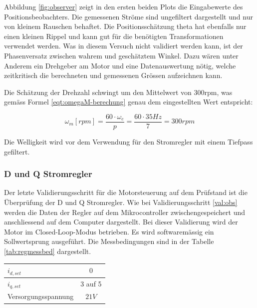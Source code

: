 Abbildung \ref{fig:observer} zeigt in den ersten beiden Plots die Eingabewerte des Positionsbeobachters. Die gemessenen Ströme sind ungefiltert dargestellt und nur von kleinem Rauschen behaftet. Die Positionsschätzung theta hat ebenfalls nur einen kleinen Rippel und kann gut für die benötigten Transformationen verwendet werden.
Was in diesem Versuch nicht validiert werden kann, ist der Phasenversatz zwischen wahrem und geschätztem Winkel. Dazu wären unter Anderem ein Drehgeber am Motor und eine Datenauswertung nötig, welche zeitkritisch die berechneten und gemessenen Grössen aufzeichnen kann.

Die Schätzung der Drehzahl schwingt um den Mittelwert von 300rpm, was gemäss Formel \ref{eqt:omegaM-berechung} genau dem eingestellten Wert entspricht:

\begin{equation}
	\omega_m [rpm] = \frac{60 \cdot \omega_e}{p} = \frac{60 \cdot 35Hz}{7} = 300rpm
	\label{eqt:omegaM-berechung}
\end{equation}

Die Welligkeit wird vor dem Verwendung für den Stromregler mit einem Tiefpass gefiltert.

\subsubsection*{D und Q Stromregler}
Der letzte Validierungsschritt für die Motorsteuerung auf dem Prüfstand ist die Überprüfung der D und Q Stromregler. Wie bei Validierungsschritt \ref{val:obs} werden die Daten der Regler auf dem Mikrocontroller zwischengespeichert und anschliessend auf dem Computer dargestellt. Bei dieser Validierung wird der Motor im Closed-Loop-Modus betrieben. Es wird softwaremässig ein Sollwertsprung ausgeführt. Die Messbedingungen sind in der Tabelle \ref{tab:regmessbed} dargestellt.

\begin{center}
	\begin{tabular}{l|c}
		\hline 
		$i_{d,set}$ & $0$ \\ \hline
		$i_{q,set}$ & 3 auf 5 \\ \hline
		Versorgungsspannung & $21V$ \\ \hline
	\end{tabular} 
	\label{tab:regmessbed}
\end{center}

